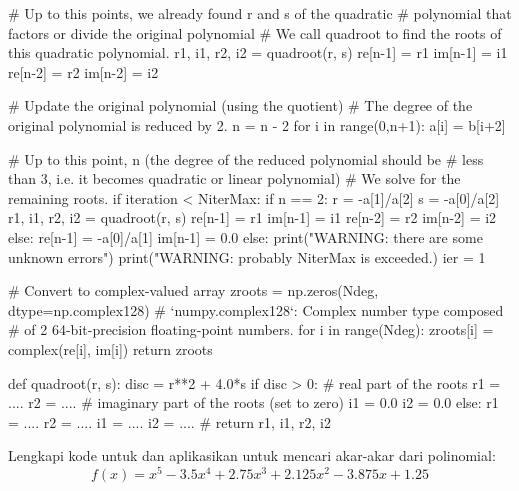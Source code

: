 \begin{pythoncode}
        # Up to this points, we already found r and s of the quadratic
        # polynomial that factors or divide the original polynomial
        # We call quadroot to find the roots of this quadratic polynomial.
        r1, i1, r2, i2  = quadroot(r, s)
        re[n-1] = r1
        im[n-1] = i1
        re[n-2] = r2
        im[n-2] = i2
        
        # Update the original polynomial (using the quotient)
        # The degree of the original polynomial is reduced by 2.
        n = n - 2
        for i in range(0,n+1):
            a[i] = b[i+2]
    
    # Up to this point, n (the degree of the reduced polynomial should be
    # less than 3, i.e. it becomes quadratic or linear polynomial)
    # We solve for the remaining roots.
    if iteration < NiterMax:
        if n == 2:
            r = -a[1]/a[2]
            s = -a[0]/a[2]
            r1, i1, r2, i2 = quadroot(r, s)
            re[n-1] = r1
            im[n-1] = i1
            re[n-2] = r2
            im[n-2] = i2
        else:
            re[n-1] = -a[0]/a[1]
            im[n-1] = 0.0
    else:
        print("WARNING: there are some unknown errors")
        print("WARNING: probably NiterMax is exceeded.)
        ier = 1
    
    # Convert to complex-valued array
    zroots = np.zeros(Ndeg, dtype=np.complex128)
    # `numpy.complex128`: Complex number type composed
    # of 2 64-bit-precision floating-point numbers.
    for i in range(Ndeg):
        zroots[i] = complex(re[i], im[i])
    return zroots
    
    
def quadroot(r, s):
    disc = r**2 + 4.0*s
    if disc > 0:
        # real part of the roots
        r1 = ....
        r2 = ....
        # imaginary part of the roots (set to zero)
        i1 = 0.0
        i2 = 0.0
    else:
        r1 = ....
        r2 = ....
        i1 = ....
        i2 = ....
    #
    return r1, i1, r2, i2    
\end{pythoncode}

\begin{soal}
Lengkapi kode untuk  dan aplikasikan untuk
mencari akar-akar dari polinomial:
\begin{equation*}
f(x) = x^5 - 3.5x^4 + 2.75x^3 + 2.125x^2 - 3.875x + 1.25
\end{equation*}
\end{soal}

